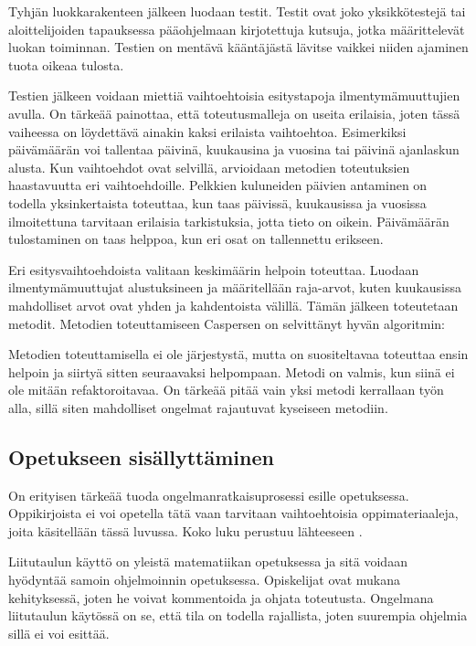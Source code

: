 Tyhjän luokkarakenteen jälkeen luodaan testit. Testit ovat joko yksikkötestejä
tai aloittelijoiden tapauksessa pääohjelmaan kirjotettuja kutsuja, jotka
määrittelevät luokan toiminnan. Testien on mentävä kääntäjästä lävitse vaikkei
niiden ajaminen tuota oikeaa tulosta.

Testien jälkeen voidaan miettiä vaihtoehtoisia esitystapoja ilmentymämuuttujien
avulla. On tärkeää painottaa, että toteutusmalleja on useita erilaisia, joten
tässä vaiheessa on löydettävä ainakin kaksi erilaista vaihtoehtoa. Esimerkiksi
päivämäärän voi tallentaa päivinä, kuukausina ja vuosina tai päivinä ajanlaskun
alusta. Kun vaihtoehdot ovat selvillä, arvioidaan metodien toteutuksien
haastavuutta eri vaihtoehdoille. Pelkkien kuluneiden päivien antaminen on
todella yksinkertaista toteuttaa, kun taas päivissä, kuukausissa ja vuosissa
ilmoitettuna tarvitaan erilaisia tarkistuksia, jotta tieto on oikein.
Päivämäärän tulostaminen on taas helppoa, kun eri osat on tallennettu erikseen.

Eri esitysvaihtoehdoista valitaan keskimäärin helpoin toteuttaa. Luodaan
ilmentymämuuttujat alustuksineen ja määritellään raja-arvot, kuten kuukausissa
mahdolliset arvot ovat yhden ja kahdentoista välillä. Tämän jälkeen toteutetaan
metodit. Metodien toteuttamiseen Caspersen on selvittänyt hyvän algoritmin:

Metodien toteuttamisella ei ole järjestystä, mutta on suositeltavaa toteuttaa
ensin helpoin ja siirtyä sitten seuraavaksi helpompaan. Metodi on valmis, kun
siinä ei ole mitään refaktoroitavaa. On tärkeää pitää vain yksi metodi
kerrallaan työn alla, sillä siten mahdolliset ongelmat rajautuvat kyseiseen
metodiin.

\subsection{Opetukseen sisällyttäminen}

On erityisen tärkeää tuoda ongelmanratkaisuprosessi esille opetuksessa.
Oppikirjoista ei voi opetella tätä vaan tarvitaan vaihtoehtoisia
oppimateriaaleja, joita käsitellään tässä luvussa. Koko luku perustuu lähteeseen
\cite{Bennedsen:2008}.

Liitutaulun käyttö on yleistä matematiikan opetuksessa ja sitä voidaan hyödyntää
samoin ohjelmoinnin opetuksessa. Opiskelijat ovat mukana kehityksessä, joten he
voivat kommentoida ja ohjata toteutusta. Ongelmana liitutaulun käytössä on se,
että tila on todella rajallista, joten suurempia ohjelmia sillä ei voi esittää.

